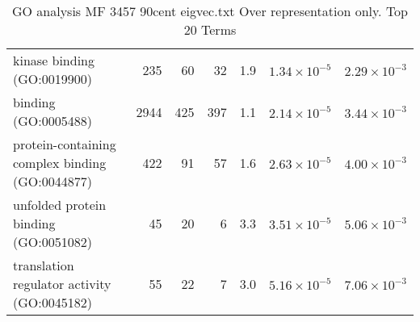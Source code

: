 \begin{table}[ht]
\begin{adjustbox}{width=\textwidth}
\begin{tabular}{lrrrrrr}
  kinase binding (GO:0019900) & 235 & 60 & 32 & 1.9 & $1.34 \times 10^{-5}$ & $2.29 \times 10^{-3}$ \\ 
  binding (GO:0005488) & 2944 & 425 & 397 & 1.1 & $2.14 \times 10^{-5}$ & $3.44 \times 10^{-3}$ \\ 
  protein-containing complex binding (GO:0044877) & 422 & 91 & 57 & 1.6 & $2.63 \times 10^{-5}$ & $4.00 \times 10^{-3}$ \\ 
  unfolded protein binding (GO:0051082) & 45 & 20 & 6 & 3.3 & $3.51 \times 10^{-5}$ & $5.06 \times 10^{-3}$ \\ 
  translation regulator activity (GO:0045182) & 55 & 22 & 7 & 3.0 & $5.16 \times 10^{-5}$ & $7.06 \times 10^{-3}$ \\ 
   \hline
\end{tabular}
\end{adjustbox}
\caption{GO analysis MF 3457 90cent eigvec.txt Over representation only. Top 20 Terms} 
\label{tab:GO analysis MF 3457 90cent eigvec.txt Over representation only. Top 10 Terms}
\end{table}








